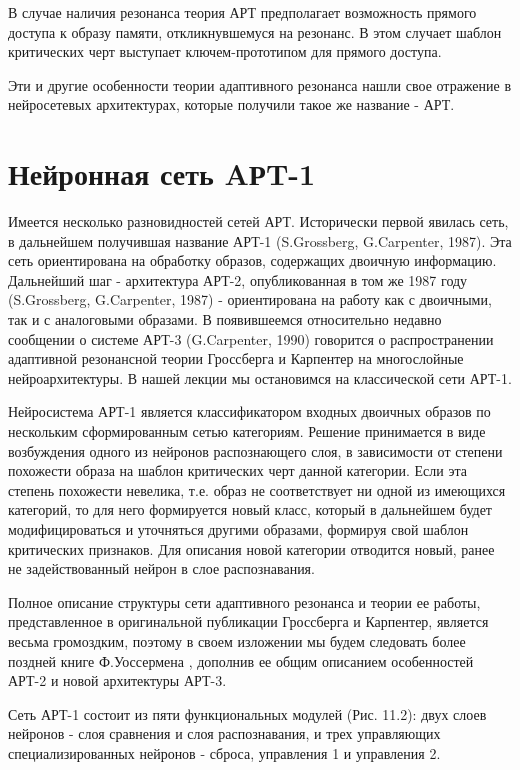 \documentclass[12pt,a4paper,article]{article}
\begin{document}
В случае наличия резонанса теория АРТ предполагает возможность прямого доступа к образу памяти, откликнувшемуся на резонанс. В этом случает шаблон критических черт выступает ключем-прототипом для прямого доступа.

Эти и другие особенности теории адаптивного резонанса нашли свое отражение в нейросетевых архитектурах, которые получили такое же название - АРТ.

\section{Нейронная сеть AРT-1}
Имеется несколько разновидностей сетей АРТ. Исторически первой явилась сеть, в дальнейшем получившая название АРТ-1 (S.Grossberg, G.Carpenter, 1987). Эта сеть ориентирована на обработку образов, содержащих двоичную информацию. Дальнейший шаг - архитектура АРТ-2, опубликованная в том же 1987 году (S.Grossberg, G.Carpenter, 1987) - ориентирована на работу как с двоичными, так и с аналоговыми образами. В появившеемся относительно недавно сообщении о системе АРТ-3 (G.Carpenter, 1990) говорится о распространении адаптивной резонансной теории Гроссберга и Карпентер на многослойные нейроархитектуры. В нашей лекции мы остановимся на классической сети АРТ-1.

Нейросистема АРТ-1 является классификатором входных двоичных образов по нескольким сформированным сетью категориям. Решение принимается в виде возбуждения одного из нейронов распознающего слоя, в зависимости от степени похожести образа на шаблон критических черт данной категории. Если эта степень похожести невелика, т.е. образ не соответствует ни одной из имеющихся категорий, то для него формируется новый класс, который в дальнейшем будет модифицироваться и уточняться другими образами, формируя свой шаблон критических признаков. Для описания новой категории отводится новый, ранее не задействованный нейрон в слое распознавания.

Полное описание структуры сети адаптивного резонанса и теории ее работы, представленное в оригинальной публикации Гроссберга и Карпентер, является весьма громоздким, поэтому в своем изложении мы будем следовать более поздней книге Ф.Уоссермена , дополнив ее общим описанием особенностей АРТ-2 и новой архитектуры АРТ-3.

Сеть АРТ-1 состоит из пяти функциональных модулей (Рис. 11.2): двух слоев нейронов - слоя сравнения и слоя распознавания, и трех управляющих специализированных нейронов - сброса, управления 1 и управления 2.
\end{document}
